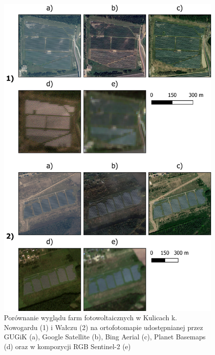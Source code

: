 \documentclass{amuthesis}
\begin{document}
\begin{figure}[H]

{\centering \includegraphics[width=1\textwidth,height=\textheight]{figures/pv.png}

}

\caption{\label{fig-rycina-pv}Porównanie wyglądu farm fotowoltaicznych w
Kulicach k. Nowogardu (1) i Wałczu (2) na ortofotomapie udostępnianej
przez GUGiK (a), Google Satellite (b), Bing Aerial (c), Planet Basemaps
(d) oraz w kompozycji RGB Sentinel-2 (e)}

\end{figure}
\end{document}
